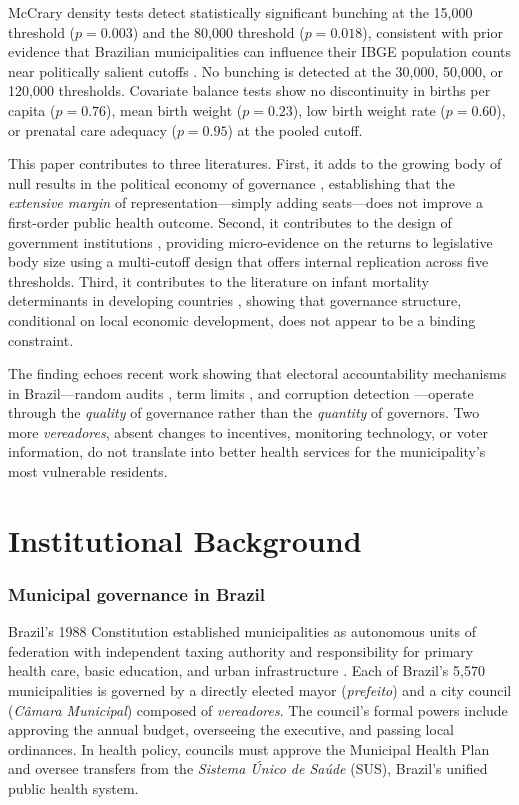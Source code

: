 \documentclass[12pt]{article}
\begin{document}
McCrary density tests \citep{mccrary2008manipulation} detect statistically significant bunching at the 15,000 threshold ($p = 0.003$) and the 80,000 threshold ($p = 0.018$), consistent with prior evidence that Brazilian municipalities can influence their IBGE population counts near politically salient cutoffs \citep{litschig2012impact, egger2022municipality}. No bunching is detected at the 30,000, 50,000, or 120,000 thresholds. Covariate balance tests show no discontinuity in births per capita ($p = 0.76$), mean birth weight ($p = 0.23$), low birth weight rate ($p = 0.60$), or prenatal care adequacy ($p = 0.95$) at the pooled cutoff.

This paper contributes to three literatures. First, it adds to the growing body of null results in the political economy of governance \citep{ferraz2011electoral, brollo2013accountability}, establishing that the \textit{extensive margin} of representation---simply adding seats---does not improve a first-order public health outcome. Second, it contributes to the design of government institutions \citep{lizzeri2001provision, myerson1993incentives}, providing micro-evidence on the returns to legislative body size using a multi-cutoff design that offers internal replication across five thresholds. Third, it contributes to the literature on infant mortality determinants in developing countries \citep{bhalotra2010fatal, almond2018childhood}, showing that governance structure, conditional on local economic development, does not appear to be a binding constraint.

The finding echoes recent work showing that electoral accountability mechanisms in Brazil---random audits \citep{ferraz2008exposing}, term limits \citep{ferraz2011electoral}, and corruption detection \citep{brollo2013accountability}---operate through the \textit{quality} of governance rather than the \textit{quantity} of governors. Two more \textit{vereadores}, absent changes to incentives, monitoring technology, or voter information, do not translate into better health services for the municipality's most vulnerable residents.


\section{Institutional Background}

\subsubsection*{Municipal governance in Brazil} Brazil's 1988 Constitution established municipalities as autonomous units of federation with independent taxing authority and responsibility for primary health care, basic education, and urban infrastructure \citep{souza2005federal}. Each of Brazil's 5,570 municipalities is governed by a directly elected mayor (\textit{prefeito}) and a city council (\textit{C\^{a}mara Municipal}) composed of \textit{vereadores}. The council's formal powers include approving the annual budget, overseeing the executive, and passing local ordinances. In health policy, councils must approve the Municipal Health Plan and oversee transfers from the \textit{Sistema \'{U}nico de Sa\'{u}de} (SUS), Brazil's unified public health system.
\end{document}
